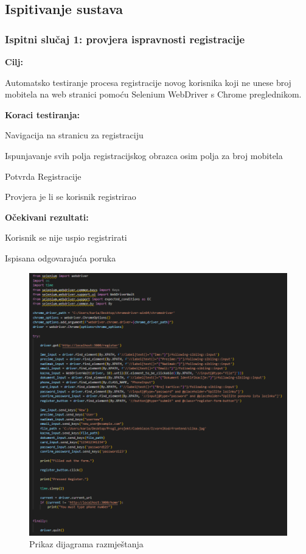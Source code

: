                        



			\subsection{Ispitivanje sustava}



			\subsubsection{Ispitni slučaj 1: provjera ispravnosti registracije}
			
			\noindent\textbf{Cilj:}
			\begin{packed_item}
				Automatsko testiranje procesa registracije novog korisnika koji ne unese broj mobitela na web stranici pomoću Selenium WebDriver s Chrome preglednikom.
			\end{packed_item}
			
			\noindent\textbf{Koraci testiranja:}
			\begin{packed_item}
				\item Navigacija na stranicu za registraciju
				\item Ispunjavanje svih polja registracijskog obrazca osim polja za broj mobitela
				\item  Potvrda Registracije
				\item  Provjera je li se korisnik registrirao
				
			\end{packed_item}
			\noindent\textbf{Očekivani rezultati:}
			\begin{packed_item}
				\item  Korisnik se nije uspio registrirati
				\item Ispisana odgovarajuća poruka
			\end{packed_item}


						\begin{figure} [H]
							\centering
							\includegraphics[width=0.7\linewidth]{slike/RegisterSelenium.png}
							\caption{Prikaz dijagrama razmještanja}
							\label{fig:Prikaz dijagrama razmještanja}
						\end{figure}
						
